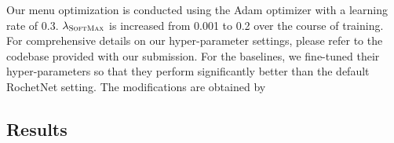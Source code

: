 Our menu optimization is conducted using the Adam optimizer with a learning rate of 0.3. $\lambda_{\textsc{SoftMax}}$ is increased from 0.001 to 0.2 over the course of training. For comprehensive details on our hyper-parameter settings, please refer to the codebase  provided with our submission. For the baselines, we fine-tuned their hyper-parameters so that they perform significantly better than the default RochetNet setting. The modifications are obtained by 



\subsection{Results}


